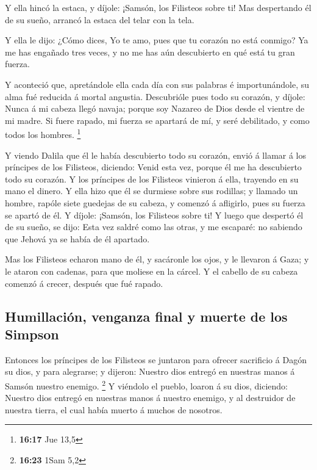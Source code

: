  Y ella hincó la estaca, y díjole: ¡Samsón, los Filisteos
sobre ti! Mas despertando él de su sueño, arrancó la estaca del telar
con la tela.

 Y ella le dijo: ¿Cómo dices, Yo te amo, pues que tu
corazón no está conmigo? Ya me has engañado tres veces, y no me has aún
descubierto en qué está tu gran fuerza.

 Y aconteció que, apretándole ella cada día con sus
palabras é importunándole, su alma fué reducida á mortal angustia.
 Descubrióle pues todo su corazón, y díjole: Nunca á mi
cabeza llegó navaja; porque soy Nazareo de Dios desde el vientre de mi
madre. Si fuere rapado, mi fuerza se apartará de mí, y seré debilitado,
y como todos los hombres. \footnote{\textbf{16:17} Jue 13,5}

 Y viendo Dalila que él le había descubierto todo su
corazón, envió á llamar á los príncipes de los Filisteos, diciendo:
Venid esta vez, porque él me ha descubierto todo su corazón. Y los
príncipes de los Filisteos vinieron á ella, trayendo en su mano el
dinero.  Y ella hizo que él se durmiese sobre sus
rodillas; y llamado un hombre, rapóle siete guedejas de su cabeza, y
comenzó á afligirlo, pues su fuerza se apartó de él.  Y
díjole: ¡Samsón, los Filisteos sobre ti! Y luego que despertó él de su
sueño, se dijo: Esta vez saldré como las otras, y me escaparé: no
sabiendo que Jehová ya se había de él apartado.

 Mas los Filisteos echaron mano de él, y sacáronle los
ojos, y le llevaron á Gaza; y le ataron con cadenas, para que moliese en
la cárcel.  Y el cabello de su cabeza comenzó á crecer,
después que fué rapado.

\hypertarget{humillaciuxf3n-venganza-final-y-muerte-de-los-simpson}{%
\subsection{Humillación, venganza final y muerte de los
Simpson}\label{humillaciuxf3n-venganza-final-y-muerte-de-los-simpson}}

 Entonces los príncipes de los Filisteos se juntaron para
ofrecer sacrificio á Dagón su dios, y para alegrarse; y dijeron: Nuestro
dios entregó en nuestras manos á Samsón nuestro enemigo. \footnote{\textbf{16:23}
  1Sam 5,2}  Y viéndolo el pueblo, loaron á su dios,
diciendo: Nuestro dios entregó en nuestras manos á nuestro enemigo, y al
destruidor de nuestra tierra, el cual había muerto á muchos de nosotros.

